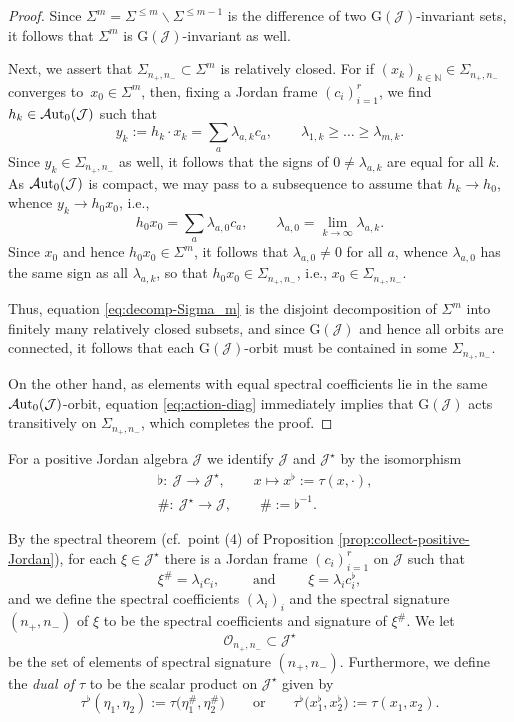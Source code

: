 \documentclass[10pt,a4paper]{amsart}
\numberwithin{equation}{section}
\newcommand{\Aut}{\mathcal{A}{\rm ut}}
\newcommand{\ocal}{\mathcal{O}}
\newcommand{\Jcal}{\mathcal{J}}
\newcommand{\G}{\mathrm{G}}
\newcommand{\N}{{\mathbb N}}
\begin{document}
\begin{proof}
Since $\Sigma^m = \Sigma^{\leq m} \backslash \Sigma^{\leq m-1}$ is the difference of two $\G(\Jcal)$-invariant sets, it follows that $\Sigma^m$ is $\G(\Jcal)$-invariant as well.

Next, we assert that $\Sigma_{n_+, n_-} \subset \Sigma^m$ is relatively closed. For if $(x_k)_{k \in \N} \in \Sigma_{n_+, n_-}$ converges to~$x_0 \in \Sigma^m$, then, fixing a Jordan frame $(c_i)_{i=1}^r$, we find $h_k \in \Aut_0(\Jcal)$ such that
\[
y_k := h_k \cdot x_k = \sum_a \lambda_{a,k} c_a, \qquad \lambda_{1,k} \geq \dots \geq \lambda_{m,k}.
\]
Since $y_k \in \Sigma_{n_+,n_-}$ as well, it follows that the signs of $0 \neq \lambda_{a,k}$ are equal for all $k$. As $\Aut_0(\Jcal)$ is compact, we may pass to a subsequence to assume that $h_k \to h_0$, whence $y_k \to h_0 x_0$, i.e.,
\[
h_0 x_0 = \sum_a \lambda_{a, 0} c_a, \qquad \lambda_{a,0} = \lim_{k\to\infty} \lambda_{a,k}.
\]
Since $x_0$ and hence $h_0 x_0 \in \Sigma^m$, it follows that $\lambda_{a,0} \neq 0$ for all $a$, whence $\lambda_{a,0}$ has the same sign as all $\lambda_{a,k}$, so that $h_0 x_0 \in \Sigma_{n_+, n_-}$, i.e., $x_0 \in \Sigma_{n_+, n_-}$.

Thus, equation \eqref{eq:decomp-Sigma_m} is the disjoint decomposition of $\Sigma^m$ into finitely many relatively closed subsets, and since $\G(\Jcal)$ and hence all orbits are connected, it follows that each $\G(\Jcal)$-orbit must be contained in some $\Sigma_{n_+,n_-}$.

On the other hand, as elements with equal spectral coefficients lie in the same $\Aut_0(\Jcal)$-orbit, equation \eqref{eq:action-diag} immediately implies that $\G(\Jcal)$ acts transitively on $\Sigma_{n_+,n_-}$, which completes the proof.
\end{proof}


For a positive Jordan algebra $\Jcal$ we identify $\Jcal$ and $\Jcal^\star$ by the isomorphism
\begin{align*}
&\flat\colon\ \Jcal \longrightarrow \Jcal^\star, \qquad x \longmapsto x^\flat := \tau(x, \cdot),\\
&\#\colon\ \Jcal^\star \longrightarrow \Jcal, \qquad \# := \flat^{-1}.
\end{align*}

By the spectral theorem (cf.\ point (4) of Proposition \ref{prop:collect-positive-Jordan}), for each $\xi \in \Jcal^\star$ there is a Jordan frame $(c_i)_{i=1}^r$ on $\Jcal$ such that
\[
\xi^\# = \lambda_i c_i,\qquad \mbox{ and } \qquad \xi = \lambda_i c_i^\flat,
\]
and we define the spectral coefficients $(\lambda_i)_i$ and the spectral signature $(n_+,n_-)$ of $\xi$ to be the spectral coefficients and signature of $\xi^\# $. We let
\[
\ocal_{n_+,n_-} \subset \Jcal^\star
\]
be the set of elements of spectral signature $(n_+,n_-)$. Furthermore, we define the {\em dual of $\tau$ } to be the scalar product on $\Jcal^\star$ given by
\[ %
\tau^\flat (\eta_1, \eta_2) := \tau\big(\eta_1^\#, \eta_2^\#\big) \qquad \mathrm{or} \qquad \tau^\flat \big(x_1^\flat, x_2^\flat\big) := \tau(x_1, x_2).
\]
\end{document}
